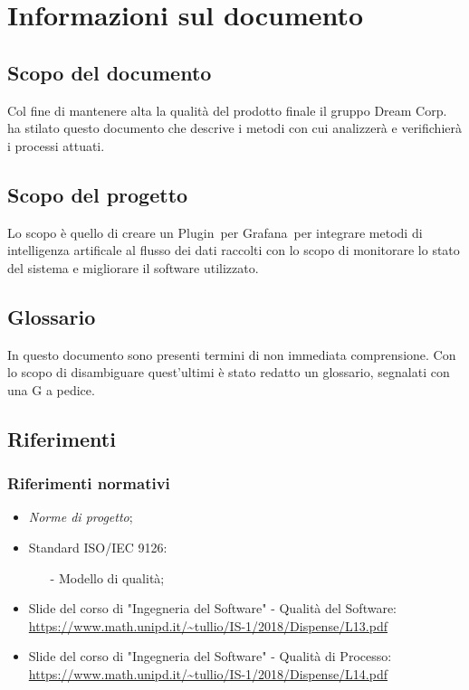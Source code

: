 \section{Informazioni sul documento}
\subsection{Scopo del documento}
 Col fine di mantenere alta la qualità del prodotto finale il gruppo Dream Corp. ha stilato questo documento che descrive i metodi con cui analizzerà e verifichierà i processi attuati.
 \subsection{Scopo del progetto}
 Lo scopo è quello di creare un Plugin\pedice~per Grafana\pedice~per integrare metodi di intelligenza artificale al flusso dei dati raccolti con lo scopo di monitorare lo stato del sistema e migliorare il software utilizzato.
 \subsection{Glossario}
 In questo documento sono presenti termini di non immediata comprensione. Con lo scopo di disambiguare quest'ultimi è stato redatto un glossario, segnalati con una G a pedice.

 \newpage
 \subsection{Riferimenti}
 \subsubsection{Riferimenti normativi}
 \begin{itemize}
 	\item \textit{Norme di progetto};
 	\item Standard ISO/IEC 9126:
 		\begin{itemize}
 			\item[-] Modello di qualità;
 		\end{itemize}
	\item Slide del corso di "Ingegneria del Software" - Qualità del Software: \\
		\url{https://www.math.unipd.it/~tullio/IS-1/2018/Dispense/L13.pdf}
	\item  Slide del corso di "Ingegneria del Software" - Qualità di Processo: \\
		\url{https://www.math.unipd.it/~tullio/IS-1/2018/Dispense/L14.pdf}
 \end{itemize}

